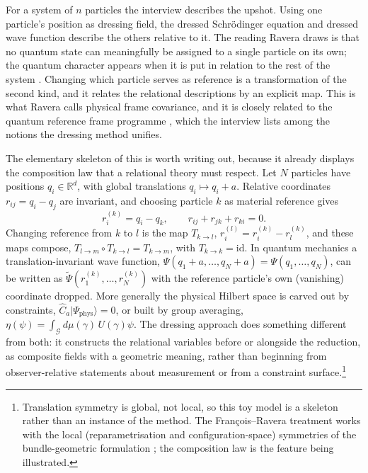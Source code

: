 \documentclass[11pt]{article}
\theoremstyle{plain}
\theoremstyle{definition}
\theoremstyle{remark}
\newcommand{\ket}[1]{\lvert #1\rangle}
\newcommand{\G}{\mathcal G}
\begin{document}
For a system of $n$ particles the interview describes the upshot. Using one particle's position as dressing field, the dressed Schr\"odinger equation and dressed wave function describe the others relative to it. The reading Ravera draws is that no quantum state can meaningfully be assigned to a single particle on its own; the quantum character appears when it is put in relation to the rest of the system \cite{toe}. Changing which particle serves as reference is a transformation of the second kind, and it relates the relational descriptions by an explicit map. This is what Ravera calls physical frame covariance, and it is closely related to the quantum reference frame programme \cite{giacomini}, which the interview lists among the notions the dressing method unifies.

The elementary skeleton of this is worth writing out, because it already displays the composition law that a relational theory must respect. Let $N$ particles have positions $q_i\in\mathbb R^d$, with global translations $q_i\mapsto q_i+a$. Relative coordinates $r_{ij}=q_i-q_j$ are invariant, and choosing particle $k$ as material reference gives
\begin{equation}
r_i^{(k)}=q_i-q_k,\qquad r_{ij}+r_{jk}+r_{ki}=0 .
\end{equation}
Changing reference from $k$ to $l$ is the map $T_{k\to l}$, $r_i^{(l)}=r_i^{(k)}-r_l^{(k)}$, and these maps compose, $T_{l\to m}\circ T_{k\to l}=T_{k\to m}$, with $T_{k\to k}=\mathrm{id}$. In quantum mechanics a translation-invariant wave function, $\Psi(q_1+a,\dots,q_N+a)=\Psi(q_1,\dots,q_N)$, can be written as $\widetilde\Psi(r^{(k)}_1,\dots,r^{(k)}_N)$ with the reference particle's own (vanishing) coordinate dropped. More generally the physical Hilbert space is carved out by constraints, $\widehat C_a\ket{\Psi_{\mathrm{phys}}}=0$, or built by group averaging, $\eta(\psi)=\int_\G d\mu(\gamma)\,U(\gamma)\psi$. The dressing approach does something different from both: it constructs the relational variables before or alongside the reduction, as composite fields with a geometric meaning, rather than beginning from observer-relative statements about measurement or from a constraint surface.\footnote{Translation symmetry is global, not local, so this toy model is a skeleton rather than an instance of the method. The François--Ravera treatment works with the local (reparametrisation and configuration-space) symmetries of the bundle-geometric formulation \cite{fr-qm,fr-mech}; the composition law is the feature being illustrated.}
\end{document}
